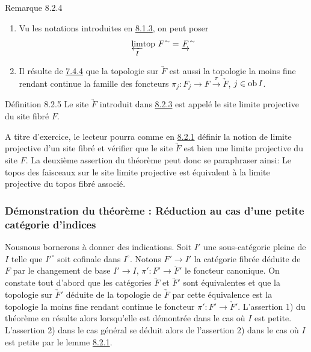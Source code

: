 \documentclass[10pt]{../fichiers-configuration-latex/smfart}
\begin{document}
\begin{enonce*}[remark]{Remarque 8.2.4}
\begin{enumerate}
\renewcommand{\labelenumi}{\theenumi)}
\item Vu les notations introduites en \hyperref[VI.subsubsec8.1.3]{8.1.3}, on peut poser
$$
{\displaystyle{\varprojlim_{I}\!\mbox{\rm top }}} F^{\sim} = \underrightarrow{F}^{\sim}
$$

\item Il résulte de \hyperref[VI.prop7.4.4]{7.4.4} que la topologie sur $\underrightarrow{F}$ est
  aussi la topologie la moins fine rendant continue la famille des
  foncteurs $\pi_j : F_j \to F \xrightarrow{\pi} \underrightarrow{F}$, $j
  \in \operatorname{ob} I$.
\end{enumerate}
\end{enonce*}

\begin{enonce*}{Définition 8.2.5}
Le site $\underrightarrow{F}$ introduit dans \hyperref[VI.thm8.2.3]{8.2.3} est appelé le site
limite projective du site fibré $F$.
\end{enonce*}

A titre d'exercice, le lecteur pourra comme en \hyperref[VI.lem8.2.1]{8.2.1}
définir la notion de limite projective d'un site fibré et vérifier
que le site $\underrightarrow{F}$ est bien une limite projective du
site $F$. La deuxième assertion du théorème peut donc se paraphraser
ainsi: Le topos des faisceaux sur le site limite projective est
équivalent à la limite projective du topos fibré associé.

\setcounter{subsubsection}{5}
\subsubsection{Démonstration du théorème : Réduction au cas d'une
  petite catégorie d'indices}

Nous\pageoriginale nous bornerons à donner des indications. Soit
$I'$ une sous-catégorie pleine de $I$ telle que ${I'}^{\circ}$ soit
cofinale dans $I^{\circ}$. Notons $F'\to I'$ la catégorie fibrée
déduite de $F$ par le changement de base $I'\to I$, $\pi': F'\to
\underrightarrow{F}'$ le foncteur canonique. On constate tout
d'abord que les catégories $\underrightarrow{F}$ et
$\underrightarrow{F}'$ sont équivalentes et que la topologie sur
$\underrightarrow{F}'$ déduite de la topologie de
$\underrightarrow{F}$ par cette équivalence est la topologie la
moins fine rendant continue le foncteur $\pi' : F'\to
\underrightarrow{F}'$. L'assertion 1) du théorème en résulte alors
lorsqu'elle est démontrée dans le cas où $I$ est petite.
L'assertion 2) dans le cas général se déduit alors de l'assertion 2)
dans le cas où $I$ est petite par le lemme \hyperref[VI.lem8.2.1]{8.2.1}.
\end{document}
